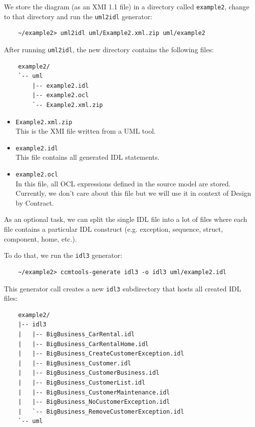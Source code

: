We store the diagram (as an XMI 1.1 file) in a directory called {\tt example2},
change to that directory and run the {\tt uml2idl} generator:
\begin{small}
\begin{verbatim}
    ~/example2> uml2idl uml/Example2.xml.zip uml/example2
\end{verbatim}
\end{small}
After running {\tt uml2idl}, the new directory contains the following files:
\begin{small}
\begin{verbatim}
    example2/
    `-- uml
        |-- example2.idl
        |-- example2.ocl
        `-- Example2.xml.zip
\end{verbatim}
\end{small}
\begin{itemize}
\item {\tt Example2.xml.zip}\\
This is the XMI file written from a UML tool.

\item {\tt example2.idl}\\ 
This file contains all generated IDL statements. 

\item {\tt example2.ocl} \\
In this file, all OCL expressions defined in the source model are stored.
Currently, we don't care about this file but we will use it in context of
Design by Contract. 
\end{itemize}

As an optional task, we can split the single IDL file into a lot of files
where each file contains a particular IDL construct (e.g. exception, sequence,
struct, component, home, etc.). 

To do that, we run the {\tt idl3} generator:
\begin{small}
\begin{verbatim}
    ~/example2> ccmtools-generate idl3 -o idl3 uml/example2.idl
\end{verbatim}
\end{small}

This generator call creates a new {\tt idl3} subdirectory that hosts all
created IDL files: 
\begin{small}
\begin{verbatim}
    example2/
    |-- idl3
    |   |-- BigBusiness_CarRental.idl
    |   |-- BigBusiness_CarRentalHome.idl
    |   |-- BigBusiness_CreateCustomerException.idl
    |   |-- BigBusiness_Customer.idl
    |   |-- BigBusiness_CustomerBusiness.idl
    |   |-- BigBusiness_CustomerList.idl
    |   |-- BigBusiness_CustomerMaintenance.idl
    |   |-- BigBusiness_NoCustomerException.idl
    |   `-- BigBusiness_RemoveCustomerException.idl
    `-- uml
\end{verbatim}
\end{small}

